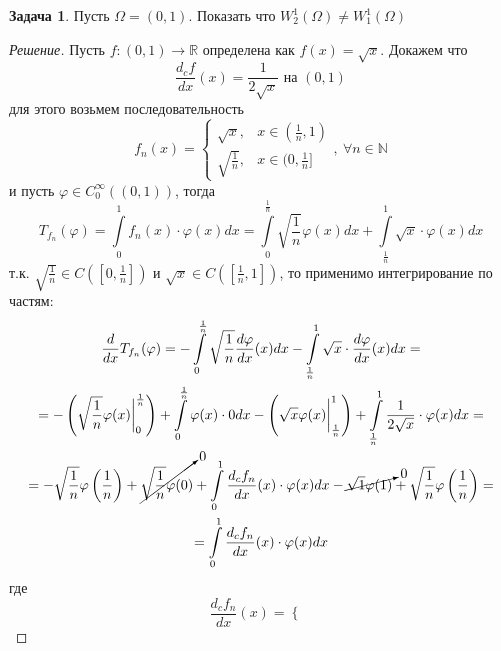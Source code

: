 \documentclass[12pt,a4paper]{article}
\theoremstyle{definition}
\newtheorem{exercise}{Задача}
\newenvironment{solution}
{\renewcommand\qedsymbol{$\blacksquare$}\begin{proof}[Решение]}
{\end{proof}}
\newcommand{\Real}{\mathbb{R}}
\newcommand{\Natural}{\mathbb{N}}
\begin{document}
\begin{exercise}
	Пусть $\Omega = (0, 1)$. Показать что $W_2^1 (\Omega) \neq W_1^1 (\Omega)$
\end{exercise}
\begin{solution}
	Пусть $f: (0, 1) \to \Real$ определена как $f(x) = \sqrt{x}$. Докажем что
	\begin{equation*}
		\frac{d_c f}{dx} (x) = \frac{1}{2\sqrt{x}} \text{ на } (0, 1)
	\end{equation*}
	для этого возьмем последовательность 
	\begin{equation*}
		f_n (x) = 
		\begin{cases}
			\sqrt{x}, &x \in (\frac{1}{n}, 1) \\
			\sqrt{\frac{1}{n}}, &x \in (0, \frac{1}{n}]
		\end{cases}, \ \forall n \in \Natural
	\end{equation*}
	и пусть $\varphi \in C_0^\infty ((0, 1))$, тогда
	\begin{equation*}
		T_{f_n} (\varphi) = \int\limits_{0}^{1}{f_n (x) \cdot \varphi(x) dx} = \int\limits_{0}^{\frac{1}{n}}{\sqrt{\frac{1}{n}} \varphi(x) dx} + \int\limits_{\frac{1}{n}}^{1}{\sqrt{x} \cdot \varphi(x) dx}
	\end{equation*}
	т.к. $\sqrt{\frac{1}{n}} \in C([0, \frac{1}{n}])$ и $\sqrt{x} \in C([\frac{1}{n}, 1])$, то применимо интегрирование по частям:
	\begin{multline*}
		\frac{d}{dx} T_{f_n} (\varphi) = -\int\limits_{0}^{\frac{1}{n}}{\sqrt{\frac{1}{n}} \frac{d \varphi}{dx} (x) dx} - \int\limits_{\frac{1}{n}}^{1}{\sqrt{x} \cdot \frac{d \varphi}{dx} (x) dx} = \\ 
		= - \left( \sqrt{\frac{1}{n}} \varphi(x) \biggr\rvert_{0}^{\frac{1}{n}}\right) + \int\limits_{0}^{\frac{1}{n}}{\varphi(x) \cdot 0 dx} - \left( \sqrt{x} \varphi(x) \biggr\rvert_{\frac{1}{n}}^{1}\right) + \int\limits_{\frac{1}{n}}^{1}{\frac{1}{2\sqrt{x}} \cdot \varphi(x) dx} = \\
		 = -\sqrt{\frac{1}{n}} \varphi\left(\frac{1}{n}\right) + \cancelto{0}{\sqrt{\frac{1}{n}}\varphi(0)} + \int\limits_{0}^{1}{\frac{d_c f_n}{dx} (x) \cdot \varphi(x) dx} - \cancelto{0}{\sqrt{1}\varphi(1)} + \sqrt{\frac{1}{n}}\varphi\left(\frac{1}{n}\right) = \\
		 = \int\limits_{0}^{1}{\frac{d_c f_n}{dx} (x) \cdot \varphi(x) dx}
	\end{multline*}
	где
	\begin{equation*}
		\frac{d_c f_n}{dx} (x) = 
		\begin{cases}

\end{cases}
\end{equation*}
\end{solution}
\end{document}
